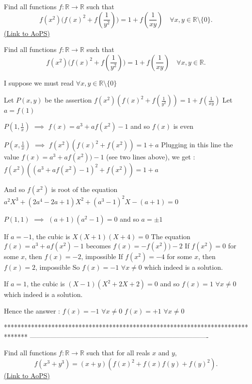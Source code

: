\begin{problem}
	Find all functions $f : \mathbb R \to \mathbb R$ such that
\[f(x^2) \biggl( f(x)^2 + f\left( \frac{1}{y^2} \right) \biggr) = 1+f\left( \frac{1}{xy} \right) \quad \forall x,y \in \mathbb R \setminus\{0\} .\]
	\flushright \href{https://artofproblemsolving.com/community/c6h391584}{(Link to AoPS)}
\end{problem}



\begin{solution}
	\begin{tcolorbox}Find all functions $f : \mathbb R \to \mathbb R$ such that
\[f(x^2) \biggl( f(x)^2 + f\left( \frac{1}{y^2} \right) \biggr) = 1+f\left( \frac{1}{xy} \right) \quad \forall x,y \in \mathbb R .\]\end{tcolorbox}
I suppose we must read $\forall x,y\in\mathbb R\setminus\{0\}$

Let $P(x,y)$ be the assertion $f(x^2)(f(x)^2+f(\frac 1{y^2}))=1+f(\frac 1{xy})$
Let $a=f(1)$

$P(1,\frac 1x)$ $\implies$ $f(x)=a^3+af(x^2)-1$ and so $f(x)$ is even

$P(x,\frac 1x)$ $\implies$ $f(x^2)(f(x)^2+f(x^2))=1+a$
Plugging in this line the value $f(x)=a^3+af(x^2))-1$ (see two lines above), we get :
$f(x^2)((a^3+af(x^2)-1)^2+f(x^2))=1+a$

And so $f(x^2)$ is root of the equation $a^2X^3+(2a^4-2a+1)X^2+(a^3-1)^2X-(a+1)=0$

$P(1,1)$ $\implies$ $(a+1)(a^2-1)=0$ and so $a=\pm 1$

If $a=-1$, the cubic is $X(X+1)(X+4)=0$
The equation $f(x)=a^3+af(x^2)-1$ becomes $f(x)=-f(x^2))-2$
If $f(x^2)=0$ for some $x$, then $f(x)=-2$, impossible
If $f(x^2)=-4$ for some $x$, then $f(x)=2$, impossible
So $f(x)=-1$ $\forall x\ne 0$ which indeed is a solution.

If $a=1$, the cubic is $(X-1)(X^2+2X+2)=0$ and so $f(x)=1$ $\forall x\ne 0$ which indeed is a solution.

Hence the answer :
$f(x)=-1$ $\forall x\ne 0$
$f(x)=+1$ $\forall x\ne 0$
\end{solution}
*******************************************************************************
-------------------------------------------------------------------------------

\begin{problem}
	Find all functions $f: \mathbb R \to \mathbb R$ such that for all reals $x$ and $y$,
\[f(x^3+y^3)=(x+y)(f(x)^2+f(x)f(y)+f(y)^2).\]
	\flushright \href{https://artofproblemsolving.com/community/c6h391700}{(Link to AoPS)}
\end{problem}



